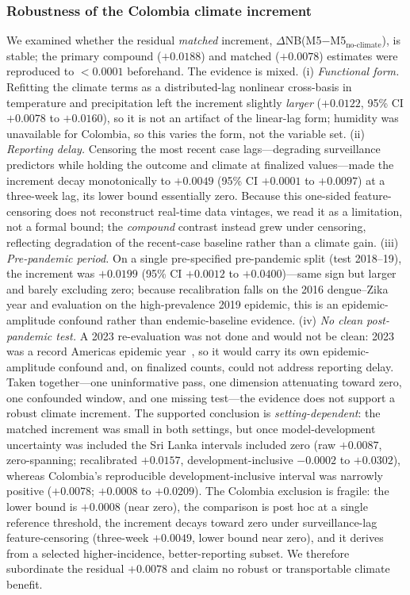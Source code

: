 \documentclass[11pt,a4paper]{article}
\begin{document}
\subsubsection*{Robustness of the Colombia climate increment}
We examined whether the residual \emph{matched} increment, $\Delta$NB(M5$-$M5$_{\text{no-climate}}$), is stable; the primary compound ($+0.0188$) and matched ($+0.0078$) estimates were reproduced to $<0.0001$ beforehand. The evidence is mixed. (i) \emph{Functional form.} Refitting the climate terms as a distributed-lag nonlinear cross-basis in temperature and precipitation left the increment slightly \emph{larger} ($+0.0122$, 95\% CI $+0.0078$ to $+0.0160$), so it is not an artifact of the linear-lag form; humidity was unavailable for Colombia, so this varies the form, not the variable set. (ii) \emph{Reporting delay.} Censoring the most recent case lags---degrading surveillance predictors while holding the outcome and climate at finalized values---made the increment decay monotonically to $+0.0049$ (95\% CI $+0.0001$ to $+0.0097$) at a three-week lag, its lower bound essentially zero. Because this one-sided feature-censoring does not reconstruct real-time data vintages, we read it as a limitation, not a formal bound; the \emph{compound} contrast instead grew under censoring, reflecting degradation of the recent-case baseline rather than a climate gain. (iii) \emph{Pre-pandemic period.} On a single pre-specified pre-pandemic split (test 2018--19), the increment was $+0.0199$ (95\% CI $+0.0012$ to $+0.0400$)---same sign but larger and barely excluding zero; because recalibration falls on the 2016 dengue--Zika year and evaluation on the high-prevalence 2019 epidemic, this is an epidemic-amplitude confound rather than endemic-baseline evidence. (iv) \emph{No clean post-pandemic test.} A 2023 re-evaluation was not done and would not be clean: 2023 was a record Americas epidemic year~\cite{PAHO2023,ValleDelCauca2024}, so it would carry its own epidemic-amplitude confound and, on finalized counts, could not address reporting delay. Taken together---one uninformative pass, one dimension attenuating toward zero, one confounded window, and one missing test---the evidence does not support a robust climate increment. The supported conclusion is \emph{setting-dependent}: the matched increment was small in both settings, but once model-development uncertainty was included the Sri Lanka intervals included zero (raw $+0.0087$, zero-spanning; recalibrated $+0.0157$, development-inclusive $-0.0002$ to $+0.0302$), whereas Colombia's reproducible development-inclusive interval was narrowly positive ($+0.0078$; $+0.0008$ to $+0.0209$). The Colombia exclusion is fragile: the lower bound is $+0.0008$ (near zero), the comparison is post hoc at a single reference threshold, the increment decays toward zero under surveillance-lag feature-censoring (three-week $+0.0049$, lower bound near zero), and it derives from a selected higher-incidence, better-reporting subset. We therefore subordinate the residual $+0.0078$ and claim no robust or transportable climate benefit.
\end{document}
